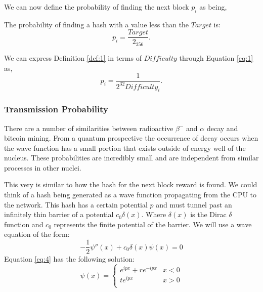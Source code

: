\documentclass[runningheads]{llncs}
\begin{document}
We can now define the probability of finding the next block $p_i$ as being,
\begin{definition} \label{def:1}
    The probability of finding a hash with a value less than the $Target$ is:
    \begin{equation}
        p_i = \frac{Target}{2_{256}}.
    \end{equation}
\end{definition}

We can express Definition \ref{def:1} in terms of $Difficulty$ through Equation \ref{eq:1} as,
\begin{equation}
    p_i = \frac{1}{2^{32}Difficulty_i}. \label{eq:3}
\end{equation}

\subsubsection{Transmission Probability}
There are a number of similarities between radioactive $\beta^-$ and $\alpha$ decay and bitcoin mining.
From a quantum prospective the occurrence of decay occurs when the wave function has a small portion that exists outside of energy well of the nucleus.
These probabilities are incredibly small and are independent from similar processes in other nuclei.

This very is similar to how the hash for the next block reward is found.
We could think of a hash being generated as a wave function propagating from the CPU to the network.
This hash has a certain potential $p$ and must tunnel past an infinitely thin barrier of a potential $c_0 \delta(x)$.
Where $\delta(x)$ is the Dirac $\delta$ function and $c_0$ represents the finite potential of the barrier.
We will use a wave equation of the form:
\begin{equation}
    -\frac{1}{2}\psi''(x) + c_0 \delta(x) \psi(x) = 0 \label{eq:4}
\end{equation}
Equation \ref{eq:4} has the following solution:
\begin{equation}
    \psi(x) =\left\{
    \begin{array}{ll}
        e^{i p x} + r e^{-i p x} & x < 0 \\
        t e^{i p x}              & x > 0 \\
    \end{array}
    \right.
\end{equation}
\end{document}
